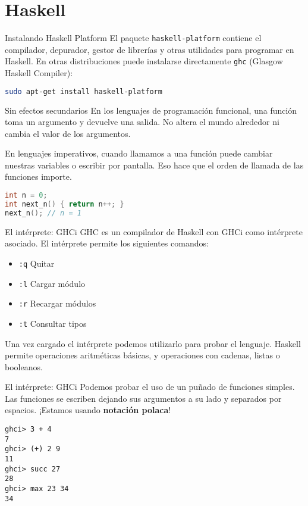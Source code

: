 \section{Haskell}

\begin{frame}[fragile]{Instalando Haskell Platform}
  El paquete \texttt{haskell-platform} contiene el compilador, depurador, gestor de
  librerías y otras utilidades para programar en Haskell.
  En otras distribuciones puede instalarse directamente \texttt{ghc}
  (Glasgow Haskell Compiler):
  \espacio

  \begin{lstlisting}[language=bash]
sudo apt-get install haskell-platform
  \end{lstlisting}
\end{frame}

\begin{frame}[fragile]{Sin efectos secundarios}
    En los lenguajes de programación funcional, una función toma un argumento y
    devuelve una salida. No altera el mundo alrededor ni cambia el valor de los argumentos.

    \espacio

    En lenguajes imperativos, cuando llamamos a una función puede cambiar nuestras
     variables o escribir por pantalla. Eso hace que el orden de llamada de las
    funciones importe.

    \espacio

  \begin{lstlisting}[language=C++]
int n = 0;
int next_n() { return n++; }
next_n(); // n = 1
  \end{lstlisting}
\end{frame}

\begin{frame}{El intérprete: GHCi}
  GHC es un compilador de Haskell con GHCi como intérprete asociado.
  El intérprete permite los siguientes comandos:
  \begin{itemize}
    \item \texttt{:q} \qquad  Quitar
    \item \texttt{:l} \qquad  Cargar módulo
    \item \texttt{:r} \qquad  Recargar módulos
    \item \texttt{:t} \qquad  Consultar tipos
  \end{itemize}

  Una vez cargado el intérprete podemos utilizarlo para probar el lenguaje.
  Haskell permite operaciones aritméticas básicas, y operaciones con
  cadenas, listas o booleanos.
\end{frame}

\begin{frame}[fragile]{El intérprete: GHCi}
  Podemos probar el uso de un puñado de funciones simples. Las funciones
  se escriben dejando sus argumentos a su lado y separados por espacios. ¡Estamos usando
  \textbf{notación polaca}!

  \begin{lstlisting}
ghci> 3 + 4
7
ghci> (+) 2 9
11
ghci> succ 27
28
ghci> max 23 34
34
  \end{lstlisting}
\end{frame}
